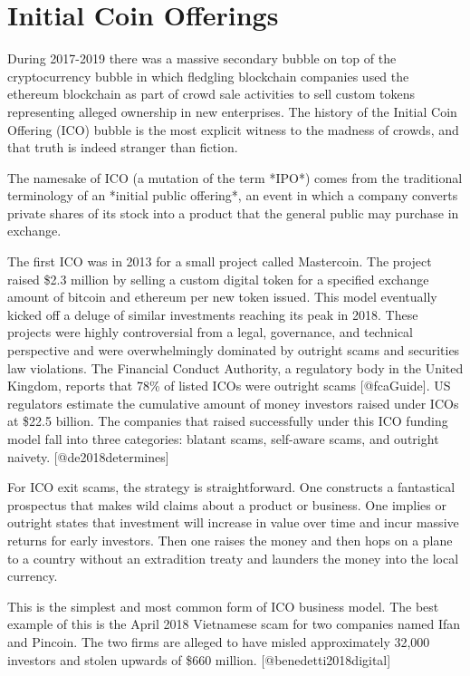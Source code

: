 \chapter{Initial Coin Offerings}

During 2017-2019 there was a massive secondary bubble on top of the
cryptocurrency bubble in which fledgling blockchain companies used the ethereum
blockchain as part of crowd sale activities to sell custom tokens representing
alleged ownership in new enterprises. The history of the Initial Coin Offering
(ICO) bubble is the most explicit witness to the madness of crowds, and that
truth is indeed stranger than fiction.

The namesake of ICO (a mutation of the term *IPO*) comes from the traditional
terminology of an *initial public offering*, an event in which a company
converts private shares of its stock into a product that the general public may
purchase in exchange.


The first ICO was in 2013 for a small project called Mastercoin. The project
raised \$2.3 million by selling a custom digital token for a specified exchange
amount of bitcoin and ethereum per new token issued. This model eventually
kicked off a deluge of similar investments reaching its peak in 2018. These
projects were highly controversial from a legal, governance, and technical
perspective and were overwhelmingly dominated by outright scams and securities
law violations. The Financial Conduct Authority, a regulatory body in the United
Kingdom, reports that 78\% of listed ICOs were outright scams [@fcaGuide]. US
regulators estimate the cumulative amount of money investors raised under ICOs
at \$22.5 billion. The companies that raised successfully under this ICO funding
model fall into three categories: blatant scams, self-aware scams, and outright
naivety. [@de2018determines]
\cite{de2018determines}


For ICO exit scams, the strategy is straightforward. One constructs a
fantastical prospectus that makes wild claims about a product or business. One
implies or outright states that investment will increase in value over time and
incur massive returns for early investors. Then one raises the money and then
hops on a plane to a country without an extradition treaty and launders the
money into the local currency.

This is the simplest and most common form of ICO business model. The best
example of this is the April 2018 Vietnamese scam for two companies named Ifan
and Pincoin. The two firms are alleged to have misled approximately 32,000
investors and stolen upwards of \$660 million. [@benedetti2018digital]
\cite{benedetti2018digital}

